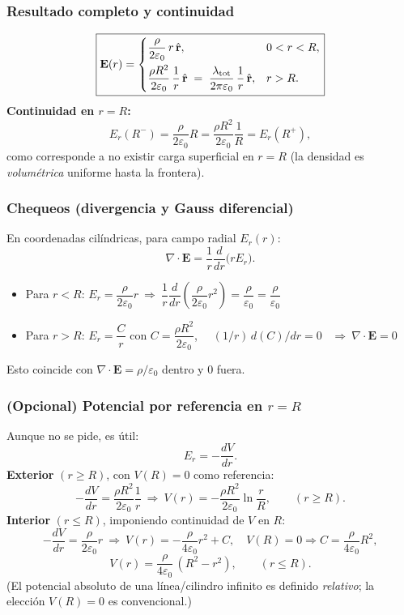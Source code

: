 \documentclass{article}
\begin{document}
\subsubsection*{Resultado completo y continuidad}
\[
\boxed{
\mathbf E(r)=
\begin{cases}
\dfrac{\rho}{2\varepsilon_0}\,r\,\hat{\mathbf r}, & 0<r<R,\\[8pt]
\dfrac{\rho R^2}{2\varepsilon_0}\,\dfrac{1}{r}\,\hat{\mathbf r}
\;=\;\dfrac{\lambda_{\rm tot}}{2\pi\varepsilon_0}\,\dfrac{1}{r}\,\hat{\mathbf r}, & r>R.
\end{cases}}
\]
\textbf{Continuidad en $r=R$:}
\[
E_r(R^-)=\frac{\rho}{2\varepsilon_0}R
=\frac{\rho R^2}{2\varepsilon_0}\frac{1}{R}=E_r(R^+),
\]
como corresponde a no existir carga superficial en $r=R$ (la densidad es \emph{volumétrica} uniforme hasta la frontera).

\subsubsection*{Chequeos (divergencia y Gauss diferencial)}
En coordenadas cilíndricas, para campo radial $E_r(r)$:
\[
\nabla\!\cdot\!\mathbf E=\frac{1}{r}\frac{d}{dr}\big(rE_r\big).
\]
\begin{itemize}
\item Para $r<R$: $E_r=\dfrac{\rho}{2\varepsilon_0}r\ \Rightarrow\
\dfrac{1}{r}\dfrac{d}{dr}\!\left(\dfrac{\rho}{2\varepsilon_0}r^2\right)=\dfrac{\rho}{\varepsilon_0}
=\dfrac{\rho}{\varepsilon_0}$ \checkmark
\item Para $r>R$: $E_r=\dfrac{C}{r}$ con $C=\dfrac{\rho R^2}{2\varepsilon_0}$,
\ \ $(1/r)\,d(C)/dr=0$ \ $\Rightarrow\ \nabla\!\cdot\!\mathbf E=0$ \checkmark
\end{itemize}
Esto coincide con $\nabla\!\cdot\!\mathbf E=\rho/\varepsilon_0$ dentro y $0$ fuera.

\subsubsection*{(Opcional) Potencial por referencia en $r=R$}
Aunque no se pide, es útil:
\[
E_r=-\frac{dV}{dr}.
\]
\textbf{Exterior} $(r\ge R)$, con $V(R)=0$ como referencia:
\[
-\frac{dV}{dr}=\frac{\rho R^2}{2\varepsilon_0}\frac{1}{r}
\ \Longrightarrow\
V(r)=-\frac{\rho R^2}{2\varepsilon_0}\ln\!\frac{r}{R},\qquad (r\ge R).
\]
\textbf{Interior} $(r\le R)$, imponiendo continuidad de $V$ en $R$:
\[
-\frac{dV}{dr}=\frac{\rho}{2\varepsilon_0}r
\ \Longrightarrow\
V(r)=-\frac{\rho}{4\varepsilon_0}r^2 + C,\quad
V(R)=0\Rightarrow C=\frac{\rho}{4\varepsilon_0}R^2,
\]
\[
V(r)=\frac{\rho}{4\varepsilon_0}\,(R^2-r^2),\qquad (r\le R).
\]
(El potencial absoluto de una línea/cilindro infinito es definido \emph{relativo}; la elección $V(R)=0$ es convencional.)
\end{document}
